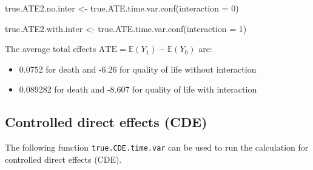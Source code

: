 \documentclass[
]{book}
\newenvironment{Shaded}{\begin{snugshade}}{\end{snugshade}}
\newcommand{\AttributeTok}[1]{\textcolor[rgb]{0.77,0.63,0.00}{#1}}
\newcommand{\DecValTok}[1]{\textcolor[rgb]{0.00,0.00,0.81}{#1}}
\newcommand{\FunctionTok}[1]{\textcolor[rgb]{0.00,0.00,0.00}{#1}}
\newcommand{\NormalTok}[1]{#1}
\newcommand{\OtherTok}[1]{\textcolor[rgb]{0.56,0.35,0.01}{#1}}
\providecommand{\tightlist}{%
  \setlength{\itemsep}{0pt}\setlength{\parskip}{0pt}}
\begin{document}
\begin{Shaded}
\begin{Highlighting}[]
\NormalTok{true.ATE2.no.inter }\OtherTok{\textless{}{-}} \FunctionTok{true.ATE.time.var.conf}\NormalTok{(}\AttributeTok{interaction =} \DecValTok{0}\NormalTok{)}

\NormalTok{true.ATE2.with.inter }\OtherTok{\textless{}{-}} \FunctionTok{true.ATE.time.var.conf}\NormalTok{(}\AttributeTok{interaction =} \DecValTok{1}\NormalTok{)}
\end{Highlighting}
\end{Shaded}

The average total effects \(\text{ATE} = \mathbb{E}(Y_1) - \mathbb{E}(Y_0)\) are:

\begin{itemize}
\tightlist
\item
  0.0752 for death and -6.26 for quality of life without interaction
\item
  0.089282 for death and -8.607 for quality of life with interaction
\end{itemize}

\hypertarget{controlled-direct-effects-cde-1}{%
\subsection{Controlled direct effects (CDE)}\label{controlled-direct-effects-cde-1}}

The following function \texttt{true.CDE.time.var} can be used to run the calculation for controlled direct effects (CDE).
\end{document}
